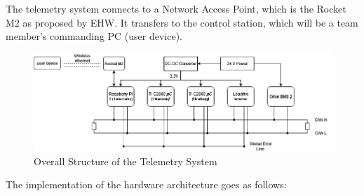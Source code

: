 The telemetry system connects to a Network Access Point, which is the Rocket M2 as proposed by EHW. It transfers to the control station, which will be a team member's commanding PC (user device).
\begin{figure}[H]
    \centering
    \includegraphics[width=\textwidth]{texfiles/elec/eimg/telemetrysystems.png}
    \caption{Overall Structure of the Telemetry System}
    \label{fig:enter-label}
\end{figure}

The implementation of the  hardware architecture goes as follows: 


